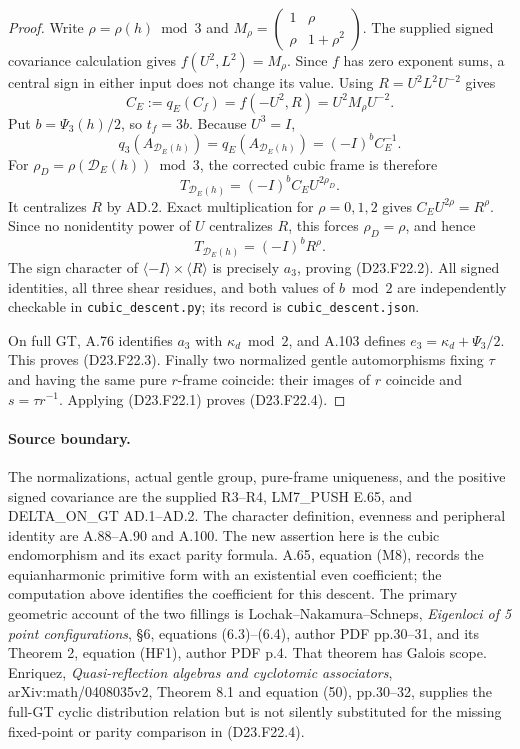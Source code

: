 \begin{proof}
Write $\rho=\rho(h)\bmod3$ and
$M_\rho=\left(\begin{smallmatrix}1&\rho\\\rho&1+\rho^2\end{smallmatrix}\right)$.
The supplied signed covariance calculation gives
$f(U^2,L^2)=M_\rho$. Since $f$ has zero exponent sums, a central
sign in either input does not change its value. Using
$R=U^2L^2U^{-2}$ gives
\[
 C_E:=q_E(C_f)=f(-U^2,R)=U^2M_\rho U^{-2}.                   \tag{D23.F22.6}
\]
Put $b=\Psi_3(h)/2$, so $t_f=3b$. Because $U^3=I$,
\[
 q_3(A_{\mathcal D_E(h)})=q_E(A_{\mathcal D_E(h)})
       =(-I)^bC_E^{-1}.
\]
For $\rho_D=\rho(\mathcal D_E(h))\bmod3$, the corrected
cubic frame is therefore
\[
 T_{\mathcal D_E(h)}=(-I)^b C_E U^{2\rho_D}.
\]
It centralizes $R$ by \textup{AD.2}. Exact multiplication for
$\rho=0,1,2$ gives
$C_EU^{2\rho}=R^\rho$. Since no nonidentity power of $U$
centralizes $R$, this forces $\rho_D=\rho$, and hence
\[
 T_{\mathcal D_E(h)}=(-I)^bR^\rho.
\]
The sign character of $\langle-I\rangle\times\langle R\rangle$
is precisely $a_3$, proving (D23.F22.2). All signed identities,
all three shear residues, and both values of $b\bmod2$ are
independently checkable in \texttt{cubic\_descent.py}; its record
is \texttt{cubic\_descent.json}.

On full GT, \textup{A.76} identifies $a_3$ with
$\kappa_d\bmod2$, and \textup{A.103} defines
$e_3=\kappa_d+\Psi_3/2$. This proves (D23.F22.3).
Finally two normalized gentle automorphisms fixing $\tau$ and
having the same pure $r$-frame coincide: their images of $r$
coincide and $s=\tau r^{-1}$. Applying (D23.F22.1) proves
(D23.F22.4).
\end{proof}

\paragraph{Source boundary.}
The normalizations, actual gentle group, pure-frame uniqueness, and
the positive signed covariance are the supplied \textup{R3--R4},
\textup{LM7\_PUSH E.65}, and \textup{DELTA\_ON\_GT AD.1--AD.2}.
The character definition, evenness and peripheral identity are
\textup{A.88--A.90} and \textup{A.100}.
The new assertion here is the cubic endomorphism and its exact
parity formula. \textup{A.65}, equation \textup{(M8)}, records the
equianharmonic primitive form with an existential even coefficient;
the computation above identifies the coefficient for this descent.
The primary geometric account of the two fillings is
Lochak--Nakamura--Schneps, \emph{Eigenloci of 5 point configurations},
\S6, equations (6.3)--(6.4), author PDF pp.30--31, and its
Theorem 2, equation (HF1), author PDF p.4. That theorem has Galois
scope. Enriquez, \emph{Quasi-reflection algebras and cyclotomic
associators}, arXiv:math/0408035v2, Theorem 8.1 and equation (50),
pp.30--32, supplies the full-GT cyclic distribution relation but
is not silently substituted for the missing fixed-point or parity
comparison in (D23.F22.4).
